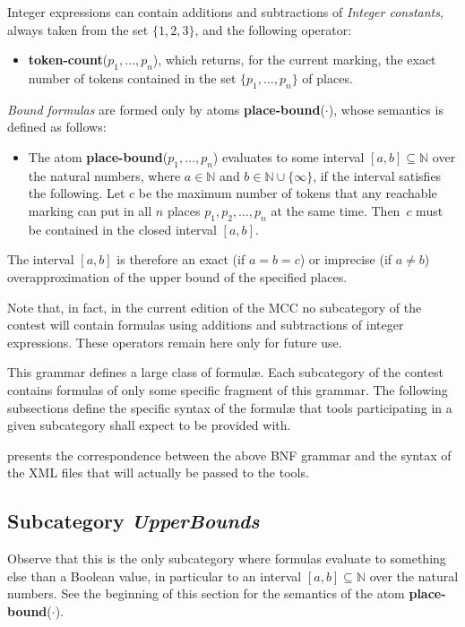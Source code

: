 \documentclass[10pt,english,a4paper]{article}
\newcommand\eqdef            {\mathrel{:=}}
\newcommand\set[1]           {{\{ #1 \mathclose \}}}
\newcommand\N                {\mathbb{N}}
\newcommand\atomplacebnd[1]  {\textbf{place-bound}(#1)}
\newcommand\atomtokenscnt[1] {\textbf{token-count}(#1)}
\newcommand{\mcc}[0]{MCC}
\begin{document}
Integer expressions can contain additions and subtractions of
\emph{Integer constants}, always taken from the set $\set{1, 2, 3}$, and
the following operator:
\begin{itemize}
\item
  \atomtokenscnt{$p_1, \ldots, p_n$}, which returns, for the current
  marking, the exact number of tokens contained in the set
  $\set{p_1, \ldots, p_n}$ of places.
\end{itemize}

\textit{Bound formulas} are formed only by atoms \atomplacebnd{$\cdot$}, whose semantics
is defined as follows:
\begin{itemize}
\item
  The atom \atomplacebnd{$p_1, \ldots, p_n$} evaluates to some interval
  $[a,b] \subseteq \N$ over the natural numbers,
  where $a \in \N$ and $b \in \N \cup \set \infty$, if
  the interval satisfies the following.
  Let $c$ be the maximum number of tokens that any reachable marking can put in all $n$
  places $p_1, p_2, \ldots, p_n$ at the same time.
  Then~$c$ must be contained in the closed interval $[a,b]$.
\end{itemize}
The interval $[a,b]$ is therefore an exact (if $a = b = c$) or imprecise
(if $a \ne b$) overapproximation of the upper bound of the specified places.

Note that, in fact, in the current edition of the \mcc{} no subcategory of the
contest will contain formulas using additions and subtractions of integer
expressions. These operators remain here only for future use.


This grammar defines a large class of formulæ.
Each subcategory of the contest contains formulas of only some specific
fragment of this grammar.
The following subsections define the specific syntax of the formul\ae{}
that tools participating in a given subcategory shall expect to be provided
with.

 presents the correspondence between the above BNF grammar
and the syntax of the XML files that will actually be passed to the tools.

\subsection{Subcategory \textit{UpperBounds}}

Observe that this is the only subcategory where formulas evaluate to something
else than a Boolean value, in particular to an interval $[a, b] \subseteq \N$
over the natural numbers. See the beginning of this section for the semantics
of the atom \atomplacebnd{$\cdot$}.
\end{document}
